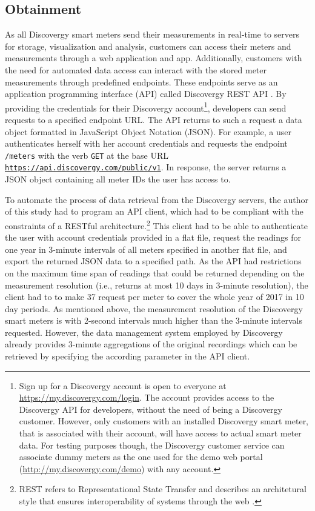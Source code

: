 
\subsection{Obtainment}\label{Sec:Data;Subsec:Obtainment}

As all Discovergy smart meters send their measurements in real-time to servers for storage, visualization and analysis, customers can access their meters and measurements through a web application and app. Additionally, customers with the need for automated data access can interact with the stored meter measurements through predefined endpoints. These endpoints serve as an application programming interface (API) called Discovergy REST API \citep{DiscovergyAPI:2018}. By providing the credentials for their Discovergy account\footnote{Sign up for a Discovergy account is open to everyone at \url{https://my.discovergy.com/login}. The account provides access to the Discovergy API for developers, without the need of being a Discovergy customer. However, only customers with an installed Discovergy smart meter, that is associated with their account, will have access to actual smart meter data. For testing purposes though, the Discovergy customer service can associate dummy meters as the one used for the demo web portal (\url{http://my.discovergy.com/demo}) with any account.}, developers can send requests to a specified endpoint URL. The API returns to such a request a data object formatted in JavaScript Object Notation (JSON). For example, a user authenticates herself with her account credentials and requests the endpoint \texttt{/meters} with the verb \texttt{GET} at the base URL \texttt{\url{https://api.discovergy.com/public/v1}}. In response, the server returns a JSON object containing all meter IDs the user has access to.

To automate the process of data retrieval from the Discovergy servers, the author of this study had to program an API client, which had to be compliant with the constraints of a RESTful architecture.\footnote{REST refers to Representational State Transfer and describes an architetural style that ensures interoperability of systems through the web \cite[][Ch. 5]{fielding:2000}.} This client had to be able to authenticate the user with account credentials provided in a flat file, request the readings for one year in 3-minute intervals of all meters specified in another flat file, and export the returned JSON data to a specified path. As the API had restrictions on the maximum time span of readings that could be returned depending on the measurement resolution (i.e., returns at most 10 days in 3-minute resolution), the client had to to make 37 request per meter to cover the whole year of 2017 in 10 day periods. As mentioned above, the measurement resolution of the Discovergy smart meters is with 2-second intervals much higher than the 3-minute intervals requested. However, the data management system employed by Discovergy already provides 3-minute aggregations of the original recordings which can be retrieved by specifying the according parameter in the API client.

